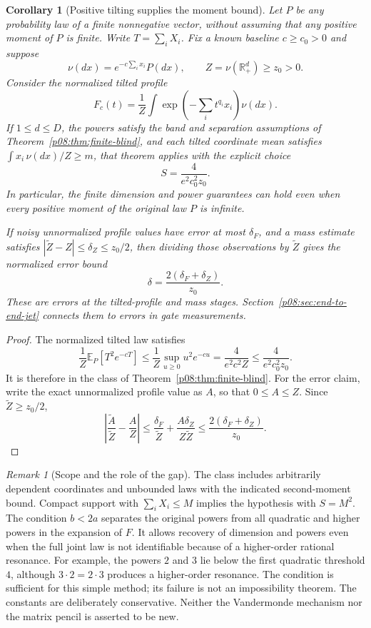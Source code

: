 \documentclass[11pt,letterpaper]{article}
\newtheorem{corollary}[theorem]{Corollary}
\theoremstyle{definition}
\theoremstyle{remark}
\newtheorem{remark}[theorem]{Remark}
\newcommand{\1}{\mathbf 1}
\begin{document}
\begin{corollary}[Positive tilting supplies the moment bound]
\label{p08:cor:finite-blind-tilt}
Let $P$ be any probability law of a finite nonnegative vector, without
assuming that any positive moment of $P$ is finite.  Write
$T=\sum_iX_i$.  Fix a known baseline $c\geq c_0>0$ and suppose
\[
 \nu(dx)=e^{-c\sum_i x_i}P(dx),\qquad Z=\nu(\mathbb R_+^d)\geq z_0>0.
\]
Consider the normalized tilted profile
\[
 F_c(t)=\frac1Z\int
       \exp\left(-\sum_i t^{q_i}x_i\right)\nu(dx).
\]
If $1\leq d\leq D$, the powers satisfy the band and separation assumptions of
Theorem~\ref{p08:thm:finite-blind}, and each tilted coordinate mean satisfies
$\int x_i\,\nu(dx)/Z\geq m$, that theorem applies with the explicit choice
\begin{equation}\label{p08:eq:finite-blind-tilted-moment}
 S=\frac{4}{e^2c_0^2z_0}.
\end{equation}
In particular, the finite dimension and power guarantees can hold even
when every positive moment of the original law $P$ is infinite.

If noisy unnormalized profile values have error at most $\delta_F$,
and a mass estimate satisfies $|\widetilde Z-Z|\leq\delta_Z\leq z_0/2$,
then dividing those observations by $\widetilde Z$ gives the normalized
error bound
\[
 \delta=\frac{2(\delta_F+\delta_Z)}{z_0}.
\]
These are errors at the tilted-profile and mass stages.
Section~\ref{p08:sec:end-to-end-jet} connects them to errors in gate measurements.
\end{corollary}
\begin{proof}
The normalized tilted law satisfies
\[
 \frac1Z\mathbb E_P[T^2e^{-cT}]
 \leq\frac1Z\sup_{u\geq0}u^2e^{-cu}
 =\frac4{e^2c^2Z}\leq\frac4{e^2c_0^2z_0}.
\]
It is therefore in the class of Theorem~\ref{p08:thm:finite-blind}.
For the error claim, write the exact unnormalized profile value as $A$,
so that $0\leq A\leq Z$.  Since $\widetilde Z\geq z_0/2$,
\[
 \left|\frac{\widetilde A}{\widetilde Z}-\frac A Z\right|
 \leq\frac{\delta_F}{\widetilde Z}
       +\frac{A\delta_Z}{Z\widetilde Z}
 \leq\frac{2(\delta_F+\delta_Z)}{z_0}.
\]
\end{proof}

\begin{remark}[Scope and the role of the gap]
The class includes arbitrarily dependent coordinates and unbounded laws
with the indicated second-moment bound.  Compact support with
$\sum_iX_i\leq M$ implies the hypothesis with $S=M^2$.
The condition $b<2a$ separates the original powers from all quadratic
and higher powers in the expansion of $F$.  It allows recovery of
dimension and powers even when the full joint law is not identifiable
because of a higher-order rational resonance.  For example, the powers
$2$ and $3$ lie below the first quadratic threshold $4$, although
$3\cdot2=2\cdot3$ produces a higher-order resonance.
The condition is sufficient for this simple method; its failure is not
an impossibility theorem.  The constants are deliberately conservative.
Neither the Vandermonde mechanism nor the matrix pencil is asserted
to be new.
\end{remark}
\end{document}
